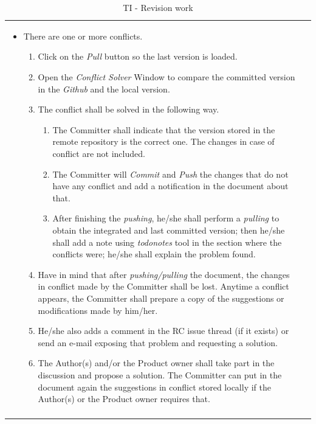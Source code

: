 \documentclass{template/openetcs_article}
\begin{document}
\begin{table}[H]
\begin{tabular}{|m{2cm}|m{12cm}|}
\begin{itemize}
\begin{itemize}
\item There are one or more conflicts.
\begin{enumerate}
\item Click on the {\it Pull} button so the last version is loaded. 
\item Open the {\it Conflict Solver} Window to compare the committed version in the {\it Github} and the local version. 
\item The conflict shall be solved in the following way.
\begin{enumerate}
\item The Committer shall indicate that the version stored in the remote repository is the correct one. The changes in case of conflict are not included. 
\item The Committer will {\it Commit} and {\it Push} the changes that do not have any conflict and add a notification in the document about that. 
\item After finishing the {\it pushing}, he/she shall perform a {\it pulling} to obtain the integrated and last committed version; then he/she shall add a note using {\it todonotes} tool in the section where the conflicts were; he/she shall explain the problem found. 
\end{enumerate}
\item Have in mind that after {\it pushing/pulling} the document, the changes in conflict made by the Committer shall be lost. Anytime a conflict appears, the Committer shall prepare a copy of the suggestions or modifications made by him/her.
\item He/she also adds a comment in the RC issue thread (if it exists) or send an e-mail exposing that problem and requesting a solution.
\item The Author(s) and/or the Product owner shall take part in the discussion and propose a solution. The Committer can put in the document again the suggestions in conflict stored locally if the Author(s) or the Product owner requires that.
\end{enumerate}
\end{itemize}
\end{itemize}
\\\\\hline
\end{tabular}
\caption{TI - Revision work}
\end{table}
\end{document}
